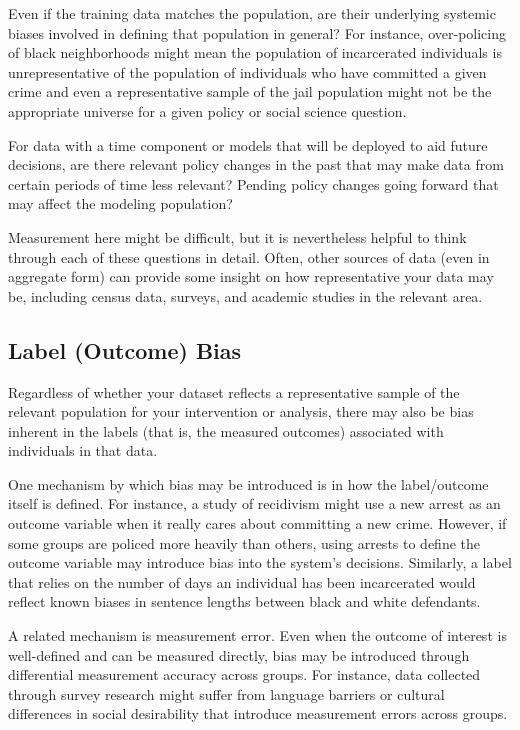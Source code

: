 \documentclass[]{krantz}
\begin{document}
Even if the training data matches the population, are their underlying
systemic biases involved in defining that population in general? For
instance, over-policing of black neighborhoods might mean the population
of incarcerated individuals is unrepresentative of the population of
individuals who have committed a given crime and even a representative
sample of the jail population might not be the appropriate universe for
a given policy or social science question.

For data with a time component or models that will be deployed to aid
future decisions, are there relevant policy changes in the past that may
make data from certain periods of time less relevant? Pending policy
changes going forward that may affect the modeling population?

Measurement here might be difficult, but it is nevertheless helpful to
think through each of these questions in detail. Often, other sources of
data (even in aggregate form) can provide some insight on how
representative your data may be, including census data, surveys, and
academic studies in the relevant area.

\subsection{Label (Outcome) Bias}\label{label-outcome-bias}

Regardless of whether your dataset reflects a representative sample of
the relevant population for your intervention or analysis, there may
also be bias inherent in the labels (that is, the measured outcomes)
associated with individuals in that data.

One mechanism by which bias may be introduced is in how the
label/outcome itself is defined. For instance, a study of recidivism
might use a new arrest as an outcome variable when it really cares about
committing a new crime. However, if some groups are policed more heavily
than others, using arrests to define the outcome variable may introduce
bias into the system's decisions. Similarly, a label that relies on the
number of days an individual has been incarcerated would reflect known
biases in sentence lengths between black and white defendants.

A related mechanism is measurement error. Even when the outcome of
interest is well-defined and can be measured directly, bias may be
introduced through differential measurement accuracy across groups. For
instance, data collected through survey research might suffer from
language barriers or cultural differences in social desirability that
introduce measurement errors across groups.
\end{document}
